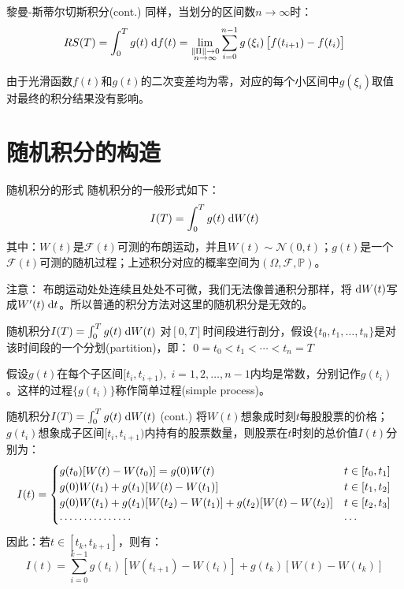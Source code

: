 \documentclass[t]{beamer}
\newcommand{\dif}{{\;\rm d}}
\renewcommand{\Pr}{\mathbb{P}}
\begin{document}
\begin{frame}{黎曼-斯蒂尔切斯积分(cont.)}
同样，当划分的区间数$n\to\infty$时：
\[RS(T)=\int^T_0 g(t)\dif f(t)=\lim_{\substack{\|\Pi\|\to 0 \\ n\to\infty}}\sum^{n-1}_{i=0}g\left(\xi_i\right)\big[f(t_{i+1})-f(t_{i})\big] \]

由于光滑函数$f(t)$和$g(t)$的二次变差均为零，对应的每个小区间中$g(\xi_i)$取值对最终的积分结果没有影响。
\end{frame}

\section{随机积分的构造}
\begin{frame}{随机积分的形式}
随机积分的一般形式如下：
\begin{equation*}
I(T)=\int^T_0 g(t)\dif W(t)
\end{equation*}
其中：$W(t)$是$\mathcal{F}(t)$可测的布朗运动，并且$W(t)\sim \mathcal{N}(0,t)$；$g(t)$是一个$\mathcal{F}(t)$可测的随机过程；上述积分对应的概率空间为$(\Omega,\mathcal{F},\Pr)$。

\begin{block}{注意：}
布朗运动处处连续且处处不可微，我们无法像普通积分那样，将$\dif W(t)$写成$W'(t)\dif t$。所以普通的积分方法对这里的随机积分是无效的。
\end{block}
\end{frame}

\begin{frame}{随机积分$I(T)=\int^T_0 g(t)\dif W(t)$}
对$[0,T]$时间段进行剖分，假设$\{t_0,t_1,\ldots,t_n\}$是对该时间段的一个分划(partition)，即：
$0=t_0< t_1< \cdots< t_n=T $

假设$g(t)$在每个子区间$[t_i,t_{i+1}),\; i=1,2,\ldots,n-1$内均是常数，分别记作$g(t_i)$。这样的过程$\{g(t_i)\}$称作简单过程(simple process)。
\end{frame}

\begin{frame}{随机积分$I(T)=\int^T_0 g(t)\dif W(t)$ (cont.)}
将$W(t)$想象成时刻$t$每股股票的价格；$g(t_i)$想象成子区间$[t_i,t_{i+1})$内持有的股票数量，则股票在$t$时刻的总价值$I(t)$分别为：
\[\normalsize I(t)= \begin{cases}
g(t_0)[W(t)-W(t_0)]=g(0)  W(t)    & t\in[t_0,t_1]\\
g(0)W(t_1)+g(t_1)[W(t)-W(t_1)]     & t\in[t_1,t_2]\\
g(0)W(t_1)+g(t_1)[W(t_2)-W(t_1)]+g(t_2)[W(t)-W(t_2)]     & t\in[t_2,t_3]\\
     \cdots\cdots\cdots\cdots\cdots &\cdots
\end{cases} \]
因此：若$t\in[t_k,t_{k+1}]$，则有：
\begin{equation*}
I(t)=\sum^{k-1}_{i=0}g(t_i)[W(t_{i+1})-W(t_{i})]+g(t_k)[W(t)-W(t_k)]
\end{equation*}
\end{frame}
\end{document}
